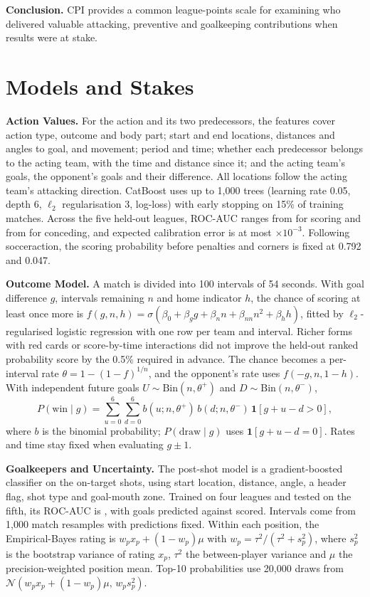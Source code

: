 \documentclass[runningheads]{llncs}
\begin{document}
\textbf{Conclusion.} CPI provides a common league-points scale for examining who delivered valuable attacking, preventive and goalkeeping contributions when results were at stake.

\appendix
\section{Models and Stakes}
\label{app:stakes}
\textbf{Action Values.} For the action and its two predecessors, the \nFeatures{} features cover action type, outcome and body part; start and end locations, distances and angles to goal, and movement; period and time; whether each predecessor belongs to the acting team, with the time and distance since it; and the acting team's goals, the opponent's goals and their difference. All locations follow the acting team's attacking direction. CatBoost uses up to 1,000 trees (learning rate 0.05, depth 6, $\ell_2$ regularisation 3, log-loss) with early stopping on 15\% of training matches. Across the five held-out leagues, ROC-AUC ranges from \foldAucS{} for scoring and from \foldAucC{} for conceding, and expected calibration error is at most \eceMax{}$\times10^{-3}$. Following socceraction, the scoring probability before penalties and corners is fixed at 0.792 and 0.047.

\textbf{Outcome Model.} A match is divided into 100 intervals of 54 seconds. With goal difference $g$, intervals remaining $n$ and home indicator $h$, the chance of scoring at least once more is $f(g,n,h)=\sigma(\beta_0+\beta_g g+\beta_n n+\beta_{nn}n^2+\beta_h h)$, fitted by $\ell_2$-regularised logistic regression with one row per team and interval. Richer forms with red cards or score-by-time interactions did not improve the held-out ranked probability score by the 0.5\% required in advance. The chance becomes a per-interval rate $\theta=1-(1-f)^{1/n}$, and the opponent's rate uses $f(-g,n,1-h)$. With independent future goals $U\sim\mathrm{Bin}(n,\theta^+)$ and $D\sim\mathrm{Bin}(n,\theta^-)$,
\begin{equation}
P(\mathrm{win}\mid g)=\sum_{u=0}^{6}\sum_{d=0}^{6}b(u;n,\theta^+)\,b(d;n,\theta^-)\,\mathbf 1[g+u-d>0],
\end{equation}
where $b$ is the binomial probability; $P(\mathrm{draw}\mid g)$ uses $\mathbf 1[g+u-d=0]$. Rates and time stay fixed when evaluating $g\pm1$.

\textbf{Goalkeepers and Uncertainty.} The post-shot model is a gradient-boosted classifier on the \psxgShots{} on-target shots, using start location, distance, angle, a header flag, shot type and goal-mouth zone. Trained on four leagues and tested on the fifth, its ROC-AUC is \psxgAuc{}, with \psxgPred{} goals predicted against \psxgGoals{} scored. Intervals come from 1,000 match resamples with predictions fixed. Within each position, the Empirical-Bayes rating is $w_px_p+(1-w_p)\mu$ with $w_p=\tau^2/(\tau^2+s_p^2)$, where $s_p^2$ is the bootstrap variance of rating $x_p$, $\tau^2$ the between-player variance and $\mu$ the precision-weighted position mean. Top-10 probabilities use 20,000 draws from $\mathcal N(w_px_p+(1-w_p)\mu,\,w_ps_p^2)$.
\end{document}

